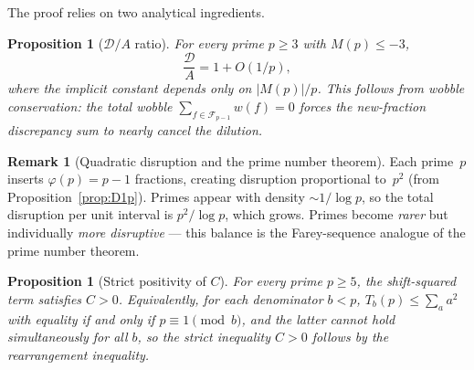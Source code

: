 \documentclass[11pt]{article}
\newtheorem{proposition}[theorem]{Proposition}
\theoremstyle{definition}
\newtheorem{remark}[theorem]{Remark}
\newcommand{\F}{\mathcal{F}}
\begin{document}
The proof relies on two analytical ingredients.

\begin{proposition}[$\mathcal{D}/A$ ratio]\label{prop:DA-ratio}
For every prime $p \ge 3$ with $M(p) \le -3$,
\[
  \frac{\mathcal{D}}{A} = 1 + O(1/p),
\]
where the implicit constant depends only on $|M(p)|/p$.
This follows from wobble conservation: the total wobble
$\sum_{f \in \F_{p-1}} w(f) = 0$ forces the new-fraction
discrepancy sum to nearly cancel the dilution.
\end{proposition}

\begin{remark}[Quadratic disruption and the prime number theorem]

Each prime~$p$ inserts $\varphi(p) = p{-}1$ fractions, creating
disruption proportional to~$p^2$ (from Proposition~\ref{prop:D1p}).
Primes appear with density $\sim 1/\log p$, so the total disruption
per unit interval is $p^2/\log p$, which grows.
Primes become \emph{rarer} but individually
\emph{more disruptive} --- this balance is the Farey-sequence
analogue of the prime number theorem.
\end{remark}

\begin{proposition}[Strict positivity of $C$]\label{prop:strict-pos}
For every prime $p \ge 5$, the shift-squared term satisfies $C > 0$.
Equivalently, for each denominator $b < p$,
$T_b(p) \le \sum_{a} a^2$ with equality if and only if
$p \equiv 1 \pmod{b}$, and the latter cannot hold simultaneously
for all $b$, so the strict inequality $C > 0$ follows by the
rearrangement inequality.
\end{proposition}
\end{document}
